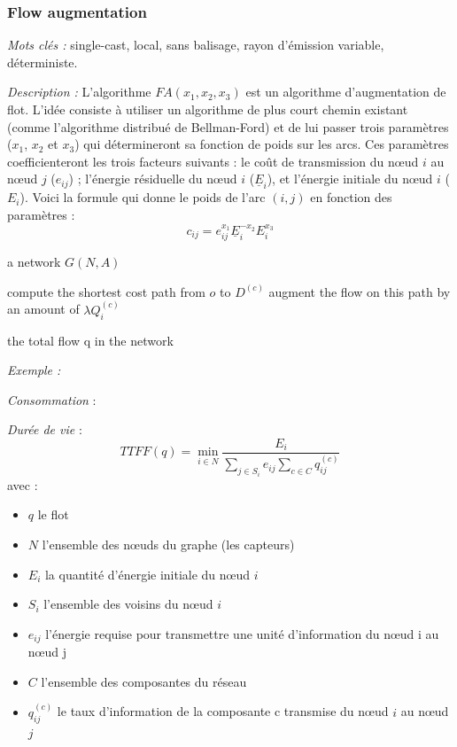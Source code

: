 \subsubsection{Flow augmentation \cite{Chang2000}}
\emph{Mots clés :} single-cast, local, sans balisage, rayon d'émission variable, déterministe.

\emph{Description :}
L'algorithme $FA(x_1, x_2, x_3)$ est un algorithme d'augmentation de flot. L'idée consiste à utiliser un algorithme de plus court chemin existant (comme l'algorithme distribué de Bellman-Ford) et de lui passer trois paramètres ($x_1$, $x_2$ et $x_3$) qui détermineront sa fonction de poids sur les arcs. Ces paramètres coefficienteront les trois facteurs suivants : le coût de transmission du nœud $i$ au nœud $j$ ($e_{ij}$) ; l'énergie résiduelle du nœud $i$ ($\underline{E}_i$), et l'énergie initiale du nœud $i$ ($E_i$). Voici la formule qui donne le poids de l'arc $(i,j)$ en fonction des paramètres :
\begin{displaymath}
c_{ij} = e_{ij}^{x_1} \underline{E}_i^{-x_2} E_i^{x_3}
\end{displaymath}

\begin{algorithm}[H]
\caption{$FA(x_1,x_2,x_3)$}
\label{algo_FA}
\begin{algorithmic}
\REQUIRE a network $ G(N,A) $

			\STATE compute the shortest cost path from $o$ to $D^{(c)}$
			\STATE augment the flow on this path by an amount of $\lambda Q_i^{(c)}$
		\ENDFOR
	\ENDFOR
\ENDWHILE

\RETURN the total flow q in the network
\end{algorithmic}
\end{algorithm}

\emph{Exemple :} %

\emph{Consommation} : 

\emph{Durée de vie} :  $$TTFF(q) = \min\limits_{i \in N}\frac{E_i}{\sum \limits_{j \in S_i} {e_{ij}} \sum \limits_{c \in C} {q_{ij}^{(c)}}}$$
avec :
\begin{itemize}
\item $q$ le flot
\item $N$ l'ensemble des nœuds du graphe (les capteurs)
\item $E_i$ la quantité d'énergie initiale du nœud $i$
\item $S_i$ l'ensemble des voisins du nœud $i$
\item $e_{ij}$ l'énergie requise pour transmettre une unité d'information du nœud i au nœud j
\item $C$ l'ensemble des composantes du réseau
\item $q_{ij}^{(c)}$ le taux d'information de la composante c transmise du nœud $i$ au nœud $j$
\end{itemize}



